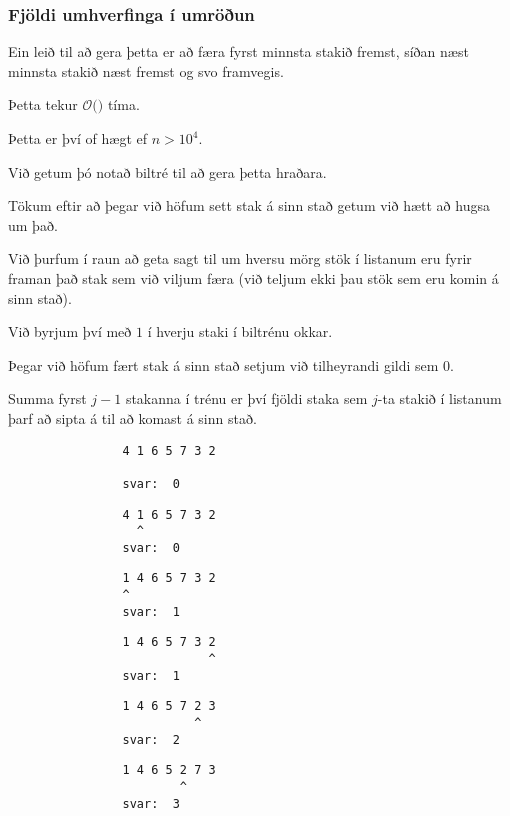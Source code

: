 {
	\frametitle{Fjöldi umhverfinga í umröðun}
	{
		\item<1-> Ein leið til að gera þetta er að færa fyrst minnsta stakið fremst, síðan næst minnsta stakið næst fremst og svo framvegis.
		\item<2-> Þetta tekur $\mathcal{O}($$)$ tíma.
		\item<4-> Þetta er því of hægt ef $n > 10^4$.
		\item<5-> Við getum þó notað biltré til að gera þetta hraðara.
		\item<6-> Tökum eftir að þegar við höfum sett stak á sinn stað getum við hætt að hugsa um það.
		\item<7-> Við þurfum í raun að geta sagt til um hversu mörg stök í listanum eru fyrir framan það stak sem við viljum færa
					(við teljum ekki þau stök sem eru komin á sinn stað).
		\item<8-> Við byrjum því með $1$ í hverju staki í biltrénu okkar.
		\item<9-> Þegar við höfum fært stak á sinn stað setjum við tilheyrandi gildi sem $0$.
		\item<10-> Summa fyrst $j - 1$ stakanna í trénu er því fjöldi staka sem $j$-ta stakið í listanum þarf að sipta á til að komast á sinn stað.
	}
}
{ \begin{verbatim}
                4 1 6 5 7 3 2

                svar:  0
\end{verbatim}}
{ \begin{verbatim}
                4 1 6 5 7 3 2
                  ^
                svar:  0
\end{verbatim}}
{ \begin{verbatim}
                1 4 6 5 7 3 2
                ^
                svar:  1
\end{verbatim}}
{ \begin{verbatim}
                1 4 6 5 7 3 2
                            ^
                svar:  1
\end{verbatim}}
{ \begin{verbatim}
                1 4 6 5 7 2 3
                          ^
                svar:  2
\end{verbatim}}
{ \begin{verbatim}
                1 4 6 5 2 7 3
                        ^
                svar:  3
\end{verbatim}}
